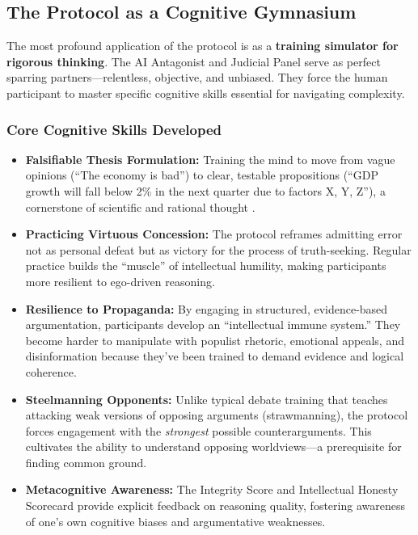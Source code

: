 \documentclass[11pt,a4paper]{article}
\begin{document}
\subsection{The Protocol as a Cognitive Gymnasium}

The most profound application of the protocol is as a \textbf{training simulator for rigorous thinking}. The AI Antagonist and Judicial Panel serve as perfect sparring partners---relentless, objective, and unbiased. They force the human participant to master specific cognitive skills essential for navigating complexity.

\subsubsection{Core Cognitive Skills Developed}

\begin{itemize}[leftmargin=*]
    \item \textbf{Falsifiable Thesis Formulation:} Training the mind to move from vague opinions (``The economy is bad'') to clear, testable propositions (``GDP growth will fall below 2\% in the next quarter due to factors X, Y, Z''), a cornerstone of scientific and rational thought \citep{Popper1959}.
    
    \item \textbf{Practicing Virtuous Concession:} The protocol reframes admitting error not as personal defeat but as victory for the process of truth-seeking. Regular practice builds the ``muscle'' of intellectual humility, making participants more resilient to ego-driven reasoning.
    
    \item \textbf{Resilience to Propaganda:} By engaging in structured, evidence-based argumentation, participants develop an ``intellectual immune system.'' They become harder to manipulate with populist rhetoric, emotional appeals, and disinformation because they've been trained to demand evidence and logical coherence.
    
    \item \textbf{Steelmanning Opponents:} Unlike typical debate training that teaches attacking weak versions of opposing arguments (strawmanning), the protocol forces engagement with the \textit{strongest} possible counterarguments. This cultivates the ability to understand opposing worldviews---a prerequisite for finding common ground.
    
    \item \textbf{Metacognitive Awareness:} The Integrity Score and Intellectual Honesty Scorecard provide explicit feedback on reasoning quality, fostering awareness of one's own cognitive biases and argumentative weaknesses.
\end{itemize}
\end{document}
